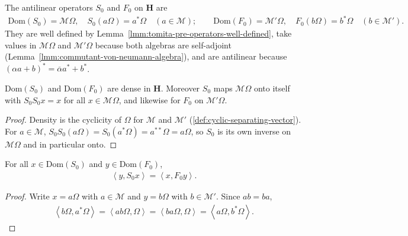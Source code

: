 \begin{definition}
    \label{def:tomita-pre-operators}
    \leanok
    The antilinear operators $S_0$ and $F_0$ on $\mathbf{H}$ are
    \begin{align}
        \text{Dom}(S_0) = \mathcal{M}\Omega, \quad S_0(a\Omega) = a^*\Omega \quad (a \in \mathcal{M}); \qquad \text{Dom}(F_0) = \mathcal{M}'\Omega, \quad F_0(b\Omega) = b^*\Omega \quad (b \in \mathcal{M}').
    \end{align}
    They are well defined by Lemma~\ref{lmm:tomita-pre-operators-well-defined}, take values in $\mathcal{M}\Omega$ and $\mathcal{M}'\Omega$ because both algebras are self-adjoint (Lemma~\ref{lmm:commutant-von-neumann-algebra}), and are antilinear because $(\alpha a + b)^* = \overline{\alpha} a^* + b^*$.
\end{definition}

\begin{lemma}
    \label{lmm:tomita-pre-operators-dense-involutive}
    \leanok
    $\text{Dom}(S_0)$ and $\text{Dom}(F_0)$ are dense in $\mathbf{H}$. Moreover $S_0$ maps $\mathcal{M}\Omega$ onto itself with $S_0 S_0 x = x$ for all $x \in \mathcal{M}\Omega$, and likewise for $F_0$ on $\mathcal{M}'\Omega$.
\end{lemma}
\begin{proof}
    \leanok
    Density is the cyclicity of $\Omega$ for $\mathcal{M}$ and $\mathcal{M}'$ (\ref{def:cyclic-separating-vector}). For $a \in \mathcal{M}$, $S_0 S_0 (a\Omega) = S_0(a^*\Omega) = a^{**}\Omega = a\Omega$, so $S_0$ is its own inverse on $\mathcal{M}\Omega$ and in particular onto.
\end{proof}

\begin{lemma}
    \label{lmm:tomita-adjoint-relation}
    \leanok
    For all $x \in \text{Dom}(S_0)$ and $y \in \text{Dom}(F_0)$,
    \begin{align}
        \left< y, S_0 x \right> = \left< x, F_0 y \right>.
    \end{align}
\end{lemma}
\begin{proof}
    \leanok
    Write $x = a\Omega$ with $a \in \mathcal{M}$ and $y = b\Omega$ with $b \in \mathcal{M}'$. Since $ab = ba$,
    \begin{align}
        \left< b\Omega, a^*\Omega \right> = \left< ab\Omega, \Omega \right> = \left< ba\Omega, \Omega \right> = \left< a\Omega, b^*\Omega \right>.
    \end{align}
\end{proof}

